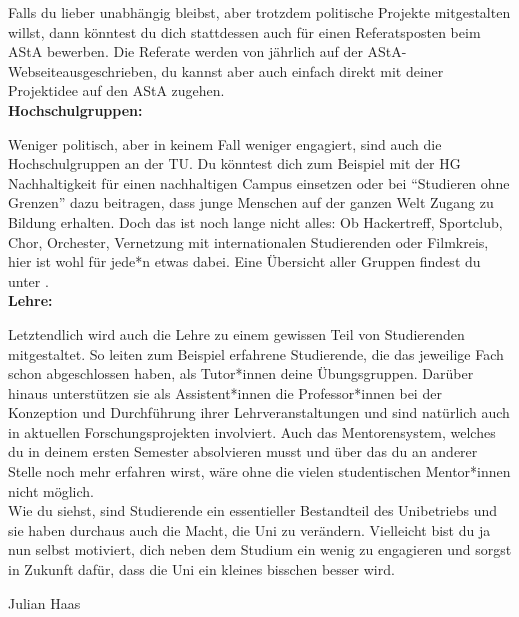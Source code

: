 {    Falls du lieber unabhängig bleibst, aber trotzdem politische Projekte mitgestalten willst, dann könntest du dich stattdessen auch für einen Referatsposten beim AStA bewerben. Die Referate werden von jährlich auf der AStA-Webseite\footnotemark[2] ausgeschrieben, du kannst aber auch einfach direkt mit deiner Projektidee auf den AStA zugehen.\\

    \textbf{Hochschulgruppen:}

    Weniger politisch, aber in keinem Fall weniger engagiert, sind auch die Hochschulgruppen an der TU. Du könntest dich zum Beispiel mit der HG Nachhaltigkeit für einen nachhaltigen Campus einsetzen oder bei "`Studieren ohne Grenzen"' dazu beitragen, dass junge Menschen auf der ganzen Welt Zugang zu Bildung erhalten.
    Doch das ist noch lange nicht alles: Ob Hackertreff, Sportclub, Chor, Orchester, Vernetzung mit internationalen Studierenden oder Filmkreis, hier ist wohl für jede*n etwas dabei.
    Eine Übersicht aller Gruppen findest du unter \footnotemark[3].\\

    \textbf{Lehre:}

    Letztendlich wird auch die Lehre zu einem gewissen Teil von Studierenden mitgestaltet. So leiten zum Beispiel erfahrene Studierende, die das jeweilige Fach schon abgeschlossen haben, als Tutor*innen deine Übungsgruppen. Darüber hinaus unterstützen sie als Assistent*innen die Professor*innen bei der Konzeption und Durchführung ihrer Lehrveranstaltungen und sind natürlich auch in aktuellen Forschungsprojekten involviert.
    Auch das Mentorensystem, welches du in deinem ersten Semester absolvieren musst und über das du an anderer Stelle noch mehr erfahren wirst, wäre ohne die vielen studentischen Mentor*innen nicht möglich.\\

    Wie du siehst, sind Studierende ein essentieller Bestandteil des Unibetriebs und sie haben durchaus auch die Macht, die Uni zu verändern. Vielleicht bist du ja nun selbst motiviert, dich neben dem Studium ein wenig zu engagieren und sorgst in Zukunft dafür, dass die Uni ein kleines bisschen besser wird.}
{Julian Haas}

